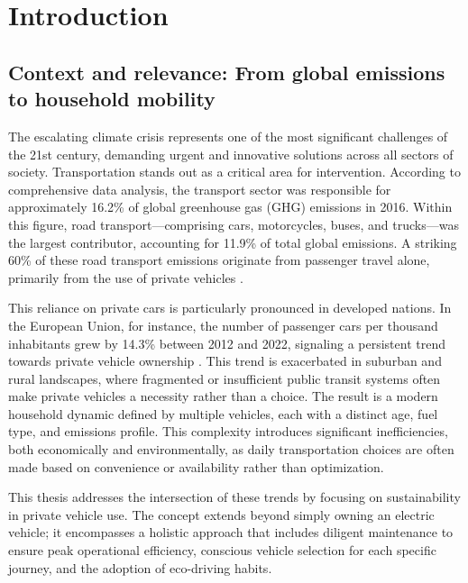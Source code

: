 \chapter{Introduction}

\section{Context and relevance: From global emissions to household mobility}

The escalating climate crisis represents one of the most significant challenges of the 21st century, demanding urgent and innovative solutions across all sectors of society. Transportation stands out as a critical area for intervention. According to comprehensive data analysis, the transport sector was responsible for approximately 16.2\% of global greenhouse gas (GHG) emissions in 2016. Within this figure, road transport—comprising cars, motorcycles, buses, and trucks—was the largest contributor, accounting for 11.9\% of total global emissions. A striking 60\% of these road transport emissions originate from passenger travel alone, primarily from the use of private vehicles \cite{owid-ghg-emissions-by-sector}.

\textgap

This reliance on private cars is particularly pronounced in developed nations. In the European Union, for instance, the number of passenger cars per thousand inhabitants grew by 14.3\% between 2012 and 2022, signaling a persistent trend towards private vehicle ownership \cite{passengers-cars-per-thousand-people}. This trend is exacerbated in suburban and rural landscapes, where fragmented or insufficient public transit systems often make private vehicles a necessity rather than a choice. The result is a modern household dynamic defined by multiple vehicles, each with a distinct age, fuel type, and emissions profile. This complexity introduces significant inefficiencies, both economically and environmentally, as daily transportation choices are often made based on convenience or availability rather than optimization.

\textgap

This thesis addresses the intersection of these trends by focusing on sustainability in private vehicle use. The concept extends beyond simply owning an electric vehicle; it encompasses a holistic approach that includes diligent maintenance to ensure peak operational efficiency, conscious vehicle selection for each specific journey, and the adoption of eco-driving habits.

